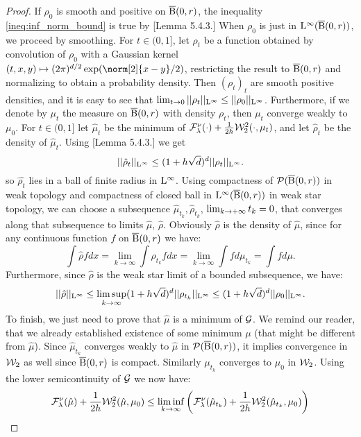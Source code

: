 \begin{proof}
If $\rho_0$ is smooth and positive on $\operatorname{\overline{B}}(0,r)$, the inequality \ref{ineq:inf_norm_bound} is true by \cite{bonnotte2013unidimensional}[Lemma 5.4.3.] When $\rho_0$ is just in $\mathrm{L}^{\infty}(\operatorname{\overline{B}}(0,r))$, we proceed by smoothing. 
For $t \in (0,1]$, let $\rho_t$ be a function obtained by convolution of $\rho_0$ with a Gaussian kernel $(t,x,y) \mapsto (2\pi)^{d/2} \exp(\norm[2]{x-y}/2)$, restricting the result to $\operatorname{\overline{B}}(0,r)$ and normalizing to obtain a probability density. Then $(\rho_t)_{t}$ are smooth positive densities, and it is easy to see that $\lim_{t \rightarrow 0} ||\rho_t||_{\mathrm{L}^{\infty}} \leq ||\rho_0||_{\mathrm{L}^{\infty}}$. Furthermore, if we denote by $\mu_t$ the measure on $\operatorname{\overline{B}}(0,r)$ with density $\rho_t$, then $\mu_t$ converge weakly to $\mu_0$.
For $t \in (0, 1]$ let $\hat{\mu}_t$ be the minimum of $ \mathcal{F}^{\nu}_{\lambda}(\cdot) + \frac{1}{2h} {\cal W}_2^2(\cdot, \mu_t)$, and let $\hat{\rho}_t$ be the density of $\hat{\mu}_t$. Using \cite{bonnotte2013unidimensional}[Lemma 5.4.3.] we get 
\[
||\hat{\rho}_t ||_{\mathrm{L}^{\infty}} \leq (1 + h\sqrt{d})^d ||\rho_t||_{\mathrm{L}^{\infty}}.
\]
so $\hat{\rho_{t}}$ lies in a ball of finite radius in $\mathrm{L}^{\infty}$.  Using compactness of $\mathcal{P}(\operatorname{\overline{B}}(0,r))$ in weak topology and compactness of closed ball in $\mathrm{L}^{\infty}(\operatorname{\overline{B}}(0,r))$ in weak star topology, we can choose a subsequence $\hat{\mu}_{t_k} , \hat{\rho}_{t_k}$, $\lim_{k \to +\infty} t_k =0$, that converges along that subsequence to limits $\hat{\mu}$, $\hat{\rho}$. Obviously $\hat{\rho}$ is the density of $\hat{\mu}$, since for any continuous function $f$  on $\operatorname{\overline{B}}(0,r)$ we have:
\[
\int \hat{\rho} f dx = \lim_{k \rightarrow \infty} \int \rho_{t_k} f dx = \lim_{k \rightarrow \infty} \int f d\mu_{t_k} = \int f d\mu.
\]
Furthermore, since $\hat{\rho}$ is the weak star limit of a bounded subsequence, we have:
\[
||\hat{\rho} ||_{\mathrm{L}^{\infty}} \leq \limsup_{k \rightarrow \infty}(1 + h\sqrt{d})^d ||\rho_{t_k}||_{\mathrm{L}^{\infty}} \leq (1 + h\sqrt{d})^d ||\rho_0||_{\mathrm{L}^{\infty}}.
\]
To finish, we just need to prove that $\hat{\mu}$ is a minimum of $\mathcal{G}$. We remind our reader, that we already established existence of some minimum $\mu$ (that might be different from $\hat{\mu}$). Since $\hat{\mu}_{t_k}$ converges weakly to $\hat{\mu}$ in $\mathcal{P}(\operatorname{\overline{B}}(0,r))$, it implies convergence  in ${\cal W}_2$ as well since $\operatorname{\overline{B}}(0,r)$ is compact. Similarly $\mu_{t_k}$ converges to $\mu_0$ in ${\cal W}_2$. Using the lower semicontinuity of $\mathcal{G}$ we now have:
\[
\begin{aligned}
\mcf^{\nu}_{\lambda}(\hat{\mu}) + \frac{1}{2h} \W^2(\hat{\mu}, \mu_0)  & \leq \liminf_{k \rightarrow \infty} \left( \mcf^{\nu}_{\lambda}(\hat{\mu}_{t_k}) + \frac{1}{2h} \W^2(\hat{\mu}_{t_k} , \mu_0) \right) \\

\end{aligned}\]
\end{proof}
